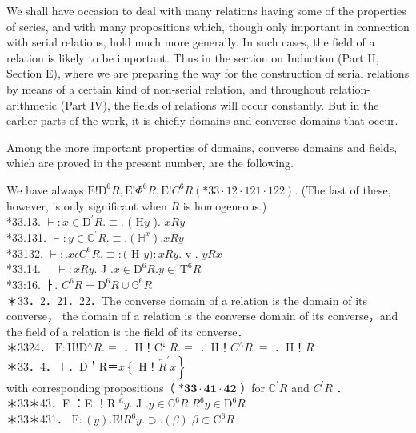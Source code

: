 \documentclass[10pt]{article}
\begin{document}
We shall have occasion to deal with many relations having some of the properties of series, and with many propositions which, though only important in connection with serial relations, hold much more generally. In such cases, the field of a relation is likely to be important. Thus in the section on Induction (Part II, Section E), where we are preparing the way for the construction of serial relations by means of a certain kind of non-serial relation, and throughout relation-arithmetic (Part IV), the fields of relations will occur constantly. But in the earlier parts of the work, it is chiefly domains and converse domains that occur.

Among the more important properties of domains, converse domains and fields, which are proved in the present number, are the following.

We have always $\mathrm{E}!\mathrm{D}^{6} R, \mathrm{E}!\Phi^{6} R, \mathrm{E}!C^{6} R(* 33 \cdot 12 \cdot 121 \cdot 122)$. (The last of these, however, is only significant when $R$ is homogeneous.)\\
*33.13. $\vdash: x \in \mathrm{D}^{\prime} R . \equiv$. ( $\mathrm{H} y$ ). $x R y$\\
*33.131. $\vdash: y \in \mathbb{C}^{\prime} R . \equiv .\left(\mathbb{H}^{x}\right) . x R y$\\
*33132. $\vdash: . x \epsilon C^{6} R . \equiv:($ H $y): x R y$. v . $y R x$\\
*33.14. $\quad \vdash: x R y$. J $. x \in \mathrm{D}^{6} R . y \in \mathrm{~T}^{6} R$\\
*33:16. ㅏ. $C^{6} R=\mathrm{D}^{6} R \cup \mathbb{G}^{6} R$\\
＊33．2．21．22．The converse domain of a relation is the domain of its converse， the domain of a relation is the converse domain of its converse，and the field of a relation is the field of its converse．\\
＊3324． $\mathrm{F}: \mathrm{H}!\mathrm{D}^{\wedge} R . \equiv$ ．H！C‘ $R . \equiv$ ．H！$C^{\wedge} R . \equiv$ ．H！$R$\\
＊33．4．＋．D＇R＝$\hat{x}\left\{\right.$ H！$\left.\overleftarrow{R}^{\prime} x\right\}$\\
with corresponding propositions（ $\boldsymbol{*} \mathbf{3 3} \cdot \mathbf{4 1} \cdot \mathbf{4 2}$ ）for $\mathbb{C}^{\prime} R$ and $C^{\prime} R$ ．\\
＊33＊43．F ：E ！R ${ }^{6} y$. J $. y \in \mathbb{G}^{6} R . R^{6} y \in \mathrm{D}^{6} R$\\
＊33＊431． $\mathrm{F}:(y) . \mathrm{E}!R^{6} y . \supset .(\beta) . \beta \subset \mathrm{C}^{6} R$\\
\end{document}
